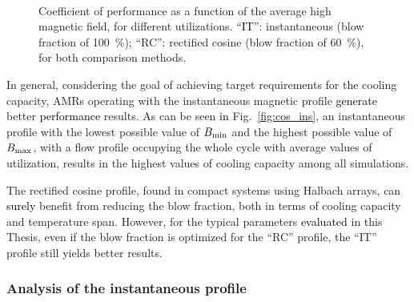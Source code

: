 \documentclass[referee]{svjour3}
\begin{document}
\begin{figure}[!ht]
  \centering
\,
\,
  \caption{Coefficient of performance as a function of the  average high magnetic field, for different utilizations. \textcolor{black}{``IT''}: instantaneous (blow fraction of \SI{100}{\percent}); ``RC'': rectified cosine  (blow fraction of \SI{60}{\percent}), for both comparison methods.}
 \label{fig:cos_ins_cop}
\end{figure}

In general, considering the goal of achieving target requirements for the cooling capacity, AMRs operating with the instantaneous magnetic profile \textcolor{black}{generate} better \textcolor{black}{performance} results. As can be seen \textcolor{black}{in} Fig.~\ref{fig:cos_ins}, an instantaneous profile with the lowest possible value of $B_{\mathrm{min}}$ and the highest possible value of $B_{\mathrm{max}}$, with a flow profile occupying the whole cycle with average values of utilization, results in the highest values of cooling capacity among all simulations. 

The rectified cosine profile, found in compact systems using Halbach arrays, can \textcolor{black}{surely} benefit from reducing the blow fraction, both in terms of cooling capacity and temperature span. However, for the typical parameters \textcolor{black}{evaluated} in this Thesis, even if the blow fraction is optimized for the ``RC'' profile, the ``IT'' profile still yields better results.

\subsubsection{Analysis of the instantaneous profile}
\label{sec:deta-analys-inst}
\end{document}
